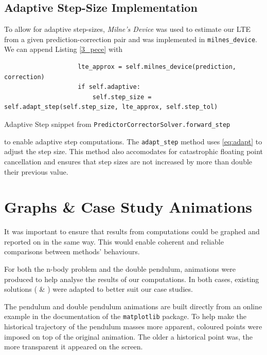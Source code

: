 \documentclass[12pt, twoside]{report}
\theoremstyle{plain}
\theoremstyle{definition}
\theoremstyle{definition}
\begin{document}
        \subsection{Adaptive Step-Size Implementation}
        \label{3_adaptive}
            To allow for adaptive step-sizes, \textit{Milne's Device} was used
            to estimate our LTE from a given prediction-correction pair and was
            implemented in \texttt{milnes_device}. We can append
            Listing \ref{3_pece} with
            \begin{listing}[H]
                \begin{verbatim}
                    lte_approx = self.milnes_device(prediction, correction)
                    if self.adaptive:
                        self.step_size = self.adapt_step(self.step_size, lte_approx, self.step_tol)
                \end{verbatim}
                \caption{Adaptive Step snippet from 
                \texttt{PredictorCorrectorSolver.forward_step}}
                \label{3_adaptive_forward}
            \end{listing}
            \noindent to enable adaptive step computations. The 
            \texttt{adapt_step} method uses \eqref{eq:adapt} to
            adjust the step size. This method also accomodates for catastrophic
            floating point cancellation and ensures that step sizes are not 
            increased by more than double their previous value.

    \section{Graphs \& Case Study Animations}
    \label{3_case_studies}
        It was important to ensure that results from computations could be 
        graphed and reported on in the same way. This would enable coherent
        and reliable comparisons between methods' behaviours. 

        For both the n-body problem and the double pendulum, animations were 
        produced to help analyse the results of our computations. In both cases,
        existing solutions (\cite{multicomet} \& \cite{pendulum}) were adapted
        to better suit our case studies.

        The pendulum and double pendulum animations are built directly from an 
        online example in the documentation of the 
        \texttt{matplotlib} package. To help make the historical trajectory of the pendulum masses more apparent,
        coloured points were imposed on top of the original animation. The older
        a historical point was, the more transparent it appeared on the screen.
\end{document}
